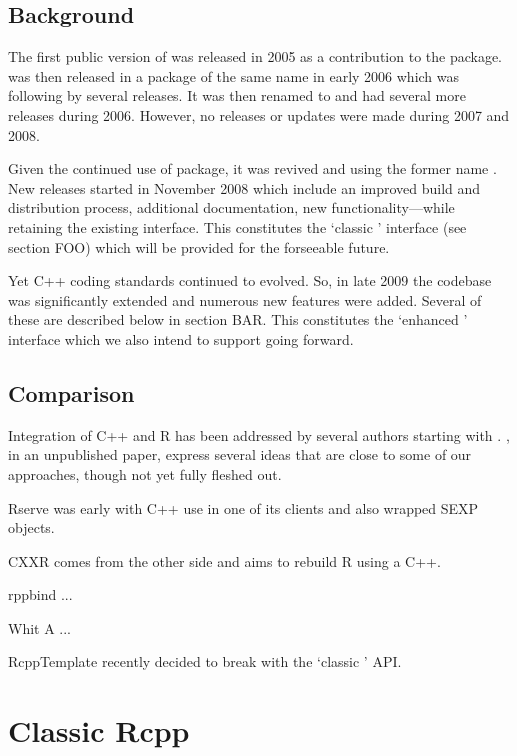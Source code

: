 \subsection{Background}

The first public version of  was released in 2005 as a contribution
to the  package.   was then released in a package of
the same name in early 2006 which was following by several releases. It was
then renamed to  and had several more releases during 2006.
However, no releases or updates were made during 2007 and 2008.  

Given the continued use of package, it was revived and using the former name
. New releases started in November 2008 which include an improved
build and distribution process, additional documentation, new
functionality---while retaining the existing interface.  This constitutes the
`classic ' interface (see section FOO) which will be provided for
the forseeable future.

Yet C++ coding standards continued to evolved. So, in late 2009 the codebase
was significantly extended and numerous new features were added.  Several of
these are described below in section BAR. This constitutes the `enhanced
' interface which we also intend to support going forward.

\subsection{Comparison}

Integration of C++ and R has been addressed by several authors starting with
\cite{batesdebroy01:cppclasses}. \cite{javagailemanly07:r_cpp}, in an
unpublished paper, express several ideas that are close to some of our
approaches, though not yet fully fleshed out.

Rserve was early with C++ use in one of its clients and also wrapped SEXP
objects. 

CXXR comes from the other side and aims to rebuild R using a C++.

rppbind ...

Whit A ...

RcppTemplate recently decided to break with the `classic '  API.


\section{Classic Rcpp}

